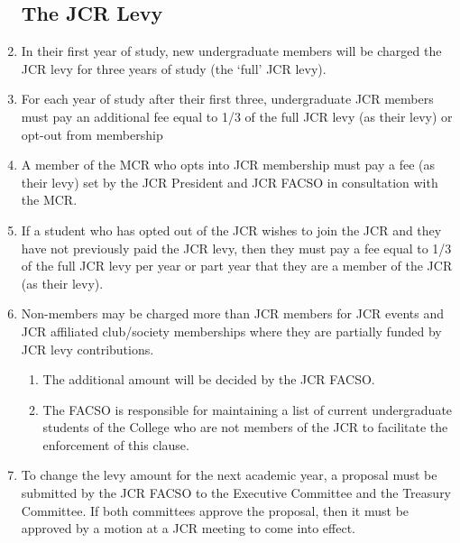 \documentclass[12pt]{article}  %
\begin{document}
\begin{enumerate}
    \subsection{The JCR Levy}
    \item In their first year of study, new undergraduate members will be charged the JCR levy for three years of study (the ‘full’ JCR levy). 
    \item For each year of study after their first three, undergraduate JCR members must pay an additional fee equal to 1/3 of the full JCR levy (as their levy) or opt-out from membership
    \item A member of the MCR who opts into JCR membership must pay a fee (as their levy) set by the JCR President and JCR FACSO in consultation with the MCR.
    \item If a student who has opted out of the JCR wishes to join the JCR and they have not previously paid the JCR levy, then they must pay a fee equal to 1/3 of the full JCR levy per year or part year that they are a member of the JCR (as their levy).
    \item Non-members may be charged more than JCR members for JCR events and JCR affiliated club/society memberships where they are partially funded by JCR levy contributions.
    \begin{enumerate}
        \item The additional amount will be decided by the JCR FACSO.
        \item The FACSO is responsible for maintaining a list of current undergraduate students of the College who are not members of the JCR to facilitate the enforcement of this clause.
    \end{enumerate}
    \item To change the levy amount for the next academic year, a proposal must be submitted by the JCR FACSO to the Executive Committee and the Treasury Committee. If both committees approve the proposal, then it must be approved by a motion at a JCR meeting to come into effect.
\end{enumerate}
\end{document}
